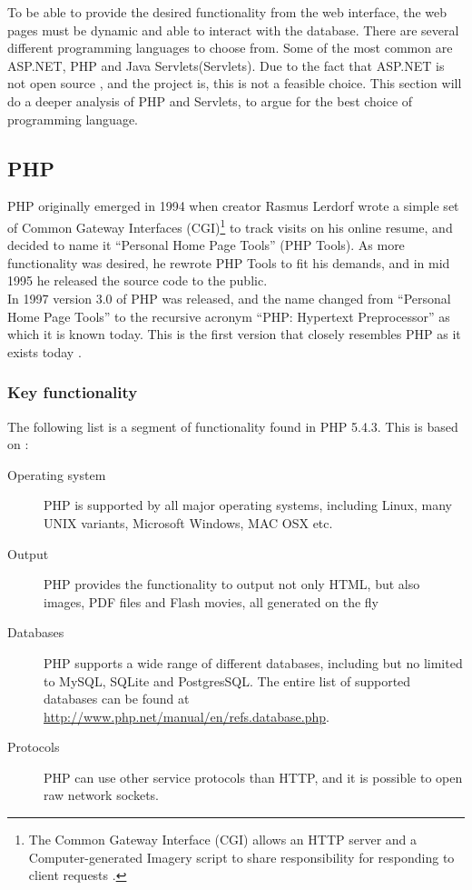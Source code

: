 To be able to provide the desired functionality from the web interface, the web pages must be dynamic and able to interact with the database. There are several different programming languages to choose from. Some of the most common are ASP.NET, PHP and Java Servlets(Servlets). Due to the fact that ASP.NET is not open source \cite{aspTerms}, and the project is, this is not a feasible choice. This section will do a deeper analysis of PHP and Servlets, to argue for the best choice of programming language.

\subsection*{PHP}
PHP originally emerged in 1994 when creator Rasmus Lerdorf wrote a simple set of Common Gateway Interfaces (CGI)\footnote{The Common Gateway Interface (CGI) allows an HTTP server and a Computer-generated Imagery script to share responsibility for responding to client requests \cite{CGI}.} to track visits on his online resume, and decided to name it ``Personal Home Page Tools'' (PHP Tools). As more functionality was desired, he rewrote PHP Tools to fit his demands, and in mid 1995 he released the source code to the public.
\\In 1997 version 3.0 of PHP was released, and the name changed from ``Personal Home Page Tools'' to the recursive acronym ``PHP: Hypertext Preprocessor'' as which it is known today. This is the first version that closely resembles PHP as it exists today \cite{phpHistory}.


\subsubsection*{Key functionality}

\noindent The following list is a segment of functionality found in PHP 5.4.3. This is based on \cite{phpFunctionality}:

\begin{description}
	\item[Operating system] PHP is supported by all major operating systems, including Linux, many UNIX variants, Microsoft Windows, MAC OSX etc.
	\item[Output] PHP provides the functionality to output not only HTML, but also images, PDF files and Flash movies, all generated on the fly
	\item[Databases] PHP supports a wide range of different databases, including but no limited to MySQL, SQLite and PostgresSQL. The entire list of supported databases can be found at \url{http://www.php.net/manual/en/refs.database.php}. 
	\item[Protocols] PHP can use other service protocols than HTTP, and it is possible to open raw network sockets.
\end{description}


